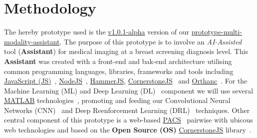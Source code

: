 
\section{Methodology}
\label{sec:sec004}

The hereby prototype used is the \hyperlink{https://github.com/mida-project/prototype-multi-modality-assistant/releases/tag/v1.0.1-alpha}{v1.0.1-alpha} version of our \hyperlink{https://github.com/mida-project/prototype-multi-modality-assistant/}{prototype-multi-modality-assistant}. The purpose of this prototype is to involve an \textit{AI-Assisted} tool (\textbf{Assistant}) for medical imaging at a breast screening diagnosis level. This \textbf{Assistant} was created with a front-end and bak-end architecture utilising common programming languages, libraries, frameworks and tools including \hyperlink{https://www.javascript.com/}{JavaScript (JS)}~\cite{flanagan2006javascript}, \hyperlink{https://nodejs.org/}{NodeJS}~\cite{wilson2018node}, \hyperlink{https://hammerjs.github.io/}{HammerJS}, \hyperlink{https://cornerstonejs.org/}{CornerstoneJS}~\cite{hostetter2018integration} and \hyperlink{https://www.orthanc-server.com/}{Orthanc}~\cite{Jodogne:ISBI2013}. For the Machine Learning (ML) and Deep Learning (DL)~\cite{ribeiro2017real, ribeiro2016real} component we will use several \hyperlink{https://www.mathworks.com/products/matlab.html}{MATLAB} technologies~\cite{vedaldi2015matconvnet}, promoting and feeding our Convolutional Neural Networks (CNN)~\cite{carneiro2015unregistered} and Deep Reenforcement Learning (DRL)~\cite{maicas2017deep} techniques. Other central component of this prototype is a web-based \hyperlink{https://www.sciencedirect.com/topics/medicine-and-dentistry/picture-archiving-and-communication-system}{PACS}~\cite{cooke2003picture} pairwise with ubicous web technologies and based on the \textbf{Open Source (OS)} \hyperlink{https://cornerstonejs.org/}{CornerstoneJS} library~\cite{feller2002understanding, hostetter2018integration}.


